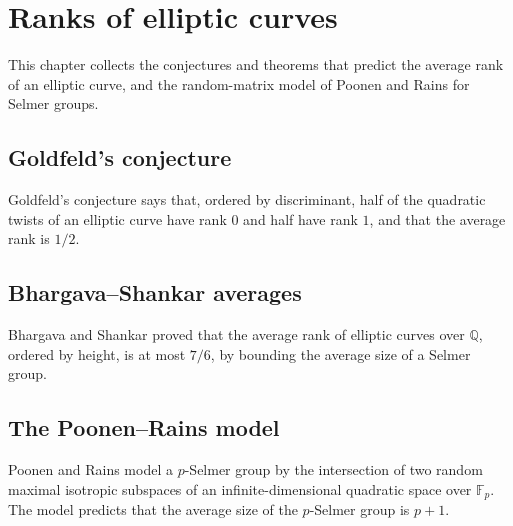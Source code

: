 \chapter{Ranks of elliptic curves}\label{ch:oc-ranks}

This chapter collects the conjectures and theorems that predict the average rank of an elliptic curve, and the random-matrix model of Poonen and Rains for Selmer groups.

\section{Goldfeld's conjecture}

Goldfeld's conjecture says that, ordered by discriminant, half of the quadratic twists of an elliptic curve have rank $0$ and half have rank $1$, and that the average rank is $1/2$.

\section{Bhargava--Shankar averages}

Bhargava and Shankar proved that the average rank of elliptic curves over $\mathbb Q$, ordered by height, is at most $7/6$, by bounding the average size of a Selmer group.

\section{The Poonen--Rains model}

Poonen and Rains model a $p$-Selmer group by the intersection of two random maximal isotropic subspaces of an infinite-dimensional quadratic space over $\mathbb F_p$. The model predicts that the average size of the $p$-Selmer group is $p+1$.

